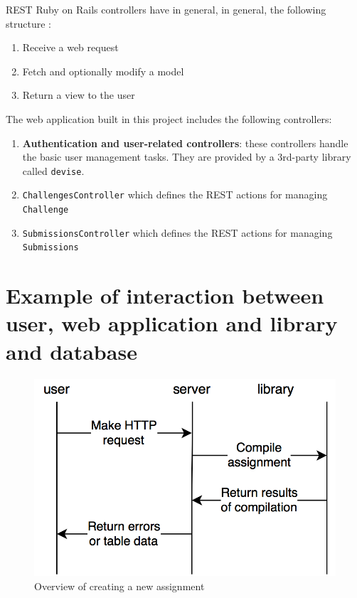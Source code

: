 REST Ruby on Rails controllers have in general, in general, the following structure \citep{RoRDocumentation}:
\begin{enumerate}
    \item Receive a web request
    \item Fetch and optionally modify a model
    \item Return a view to the user
\end{enumerate}

The web application built in this project includes the following controllers:
\begin{enumerate}
    \item \textbf{Authentication and user-related controllers}: these controllers handle the basic user management tasks. They are provided by a 3rd-party library called \texttt{devise}.
    \item \texttt{ChallengesController} which defines the REST actions for managing \texttt{Challenge}
    \item \texttt{SubmissionsController} which defines the REST actions for managing \texttt{Submissions}

\end{enumerate}

\section{Example of interaction between user, web application and library and database}

\begin{figure}[H]
    \centering
    \includegraphics[width=(\linewidth / 2)]{Chapters/4-Design/create_assignment.png}
    \caption{Overview of creating a new assignment}
    \label{fig:create_assignment}
\end{figure}


